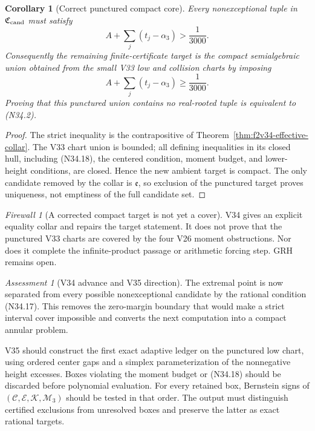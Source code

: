 \documentclass[11pt]{article}
\newtheorem{corollary}[theorem]{Corollary}
\theoremstyle{definition}
\theoremstyle{remark}
\newtheorem{assessment}[theorem]{Assessment}
\newtheorem{firewall}[theorem]{Firewall}
\begin{document}
\begin{corollary}[Correct punctured compact core]
\label{cor:f2v34-punctured-core}
Every nonexceptional tuple in \(\mathfrak C_{\rm cand}\) must satisfy
\[
 \boxed{
 A+\sum_j(t_j-\alpha_3)>\frac1{3000}.}
 \tag{N34.17}
\]
Consequently the remaining finite-certificate target is the compact
semialgebraic union obtained from the small V33 low and collision charts
by imposing
\[
 A+\sum_j(t_j-\alpha_3)\geq\frac1{3000}.
 \tag{N34.18}
\]
Proving that this punctured union contains no real-rooted tuple is
equivalent to \textup{(N34.2)}.
\end{corollary}

\begin{proof}
The strict inequality is the contrapositive of
Theorem~\ref{thm:f2v34-effective-collar}.  The V33 chart union is bounded;
all defining inequalities in its closed hull, including
\textup{(N34.18)}, the centered condition, moment budget, and lower-height
conditions, are closed.  Hence the new ambient target is compact.  The
only candidate removed by the collar is \(\mathfrak e\), so exclusion of
the punctured target proves uniqueness, not emptiness of the full candidate
set.
\end{proof}

\begin{firewall}[A corrected compact target is not yet a cover]
\label{fire:f2v34}
V34 gives an explicit equality collar and repairs the target statement.
It does not prove that the punctured V33 charts are covered by the four
V26 moment obstructions.  Nor does it complete the infinite-product
passage or arithmetic forcing step.  GRH remains open.
\end{firewall}

\begin{assessment}[V34 advance and V35 direction]
\label{ass:f2v34}
The extremal point is now separated from every possible nonexceptional
candidate by the rational condition \textup{(N34.17)}.  This removes the
zero-margin boundary that would make a strict interval cover impossible
and converts the next computation into a compact annular problem.

V35 should construct the first exact adaptive ledger on the punctured low
chart, using ordered center gaps and a simplex parameterization of the
nonnegative height excesses.  Boxes violating the moment budget or
\textup{(N34.18)} should be discarded before polynomial evaluation.
For every retained box, Bernstein signs of
\((\mathcal C,\mathcal E,\mathcal K,\mathcal M_3)\) should be tested in
that order.  The output must distinguish certified exclusions from
unresolved boxes and preserve the latter as exact rational targets.
\end{assessment}
\end{document}
